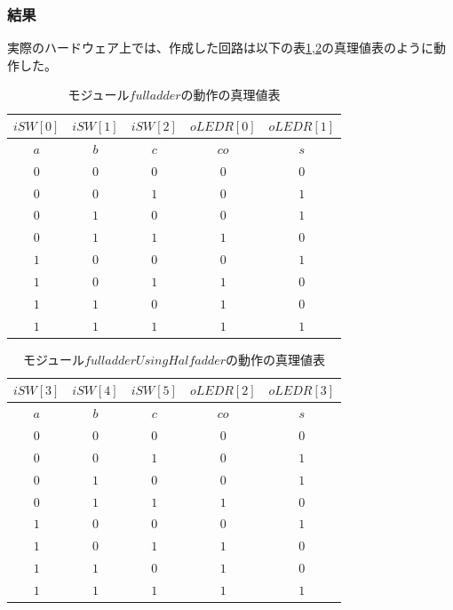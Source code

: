 \documentclass[a4paper]{jarticle}
\begin{document}
\subsubsection{結果}
実際のハードウェア上では、作成した回路は以下の表\ref{Work5FullAdderTruthTable},\ref{Work5FullAdderUsingHalfAdderTruthTable}の真理値表のように動作した。
\begin{table}[H]
	\begin{center}
		\caption{モジュール$fulladder$の動作の真理値表}
		\label{Work5FullAdderTruthTable}
		\begin{tabular}{|c|c|c|c|c|}
			\hline
			$iSW \left[ 0 \right]$	&$iSW \left[ 1 \right]$	&$iSW \left[ 2 \right]$	&$oLEDR \left[ 0 \right]$	&$oLEDR \left[ 1 \right]$\\	\hline\hline
			$a$			&$b$			&$c$			&$co$				&$s$\\				\hline\hline
			$0$			&$0$			&$0$			&$0$				&$0$\\				\hline
			$0$			&$0$			&$1$			&$0$				&$1$\\				\hline
			$0$			&$1$			&$0$			&$0$				&$1$\\				\hline
			$0$			&$1$			&$1$			&$1$				&$0$\\				\hline
			$1$			&$0$			&$0$			&$0$				&$1$\\				\hline
			$1$			&$0$			&$1$			&$1$				&$0$\\				\hline
			$1$			&$1$			&$0$			&$1$				&$0$\\				\hline
			$1$			&$1$			&$1$			&$1$				&$1$\\				\hline
		\end{tabular}
	\end{center}
\end{table}
\begin{table}[H]
	\begin{center}
		\caption{モジュール$fulladderUsingHalfadder$の動作の真理値表}
		\label{Work5FullAdderUsingHalfAdderTruthTable}
		\begin{tabular}{|c|c|c|c|c|}
			\hline
			$iSW \left[ 3 \right]$	&$iSW \left[ 4 \right]$	&$iSW \left[ 5 \right]$	&$oLEDR \left[ 2 \right]$	&$oLEDR \left[ 3 \right]$\\	\hline\hline
			$a$			&$b$			&$c$			&$co$				&$s$\\				\hline\hline
			$0$			&$0$			&$0$			&$0$				&$0$\\				\hline
			$0$			&$0$			&$1$			&$0$				&$1$\\				\hline
			$0$			&$1$			&$0$			&$0$				&$1$\\				\hline
			$0$			&$1$			&$1$			&$1$				&$0$\\				\hline
			$1$			&$0$			&$0$			&$0$				&$1$\\				\hline
			$1$			&$0$			&$1$			&$1$				&$0$\\				\hline
			$1$			&$1$			&$0$			&$1$				&$0$\\				\hline
			$1$			&$1$			&$1$			&$1$				&$1$\\				\hline
		\end{tabular}
	\end{center}
\end{table}
\end{document}

